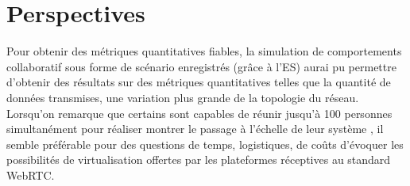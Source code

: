 \section{Perspectives}

Pour obtenir des métriques quantitatives fiables, la simulation de comportements 
collaboratif sous forme de scénario enregistrés (grâce à l'\gls{ES}) aurai pu 
permettre d'obtenir 
des résultats sur des métriques quantitatives telles que la quantité de données 
transmises, une variation plus grande de la topologie du réseau. Lorsqu'on 
remarque que certains sont capables de réunir jusqu'à 100 personnes 
simultanément pour réaliser montrer le passage à l'échelle de leur système 
\cite{Hu2017}, il semble préférable pour des questions de temps, logistiques, de 
coûts d'évoquer les possibilités de virtualisation offertes par les plateformes 
réceptives au standard WebRTC.